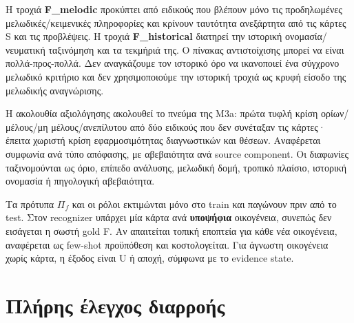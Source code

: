 \documentclass[
  10pt,
  a4paper,
]{report}
\begin{document}
Η τροχιά \textbf{F\_melodic} προκύπτει από ειδικούς που βλέπουν μόνο τις
προδηλωμένες μελωδικές/κειμενικές πληροφορίες και κρίνουν ταυτότητα
ανεξάρτητα από τις κάρτες S και τις προβλέψεις. Η τροχιά
\textbf{F\_historical} διατηρεί την ιστορική ονομασία/νευματική
ταξινόμηση και τα τεκμήριά της. Ο πίνακας αντιστοίχισης μπορεί να είναι
πολλά-προς-πολλά. Δεν αναγκάζουμε τον ιστορικό όρο να ικανοποιεί ένα
σύγχρονο μελωδικό κριτήριο και δεν χρησιμοποιούμε την ιστορική τροχιά ως
κρυφή είσοδο της μελωδικής αναγνώρισης.

Η ακολουθία αξιολόγησης ακολουθεί το πνεύμα της Μ3a: πρώτα τυφλή κρίση
ορίων/μέλους/μη μέλους/ανεπίλυτου από δύο ειδικούς που δεν συνέταξαν τις
κάρτες· έπειτα χωριστή κρίση εφαρμοσιμότητας διαγνωστικών και θέσεων.
Αναφέρεται συμφωνία ανά τύπο απόφασης, με αβεβαιότητα ανά source
component. Οι διαφωνίες ταξινομούνται ως όριο, επίπεδο ανάλυσης,
μελωδική δομή, τροπικό πλαίσιο, ιστορική ονομασία ή πηγολογική
αβεβαιότητα.

Τα πρότυπα \(\Pi_f\) και οι ρόλοι εκτιμώνται μόνο στο train και παγώνουν
πριν από το test. Στον recognizer υπάρχει μία κάρτα ανά
\textbf{υποψήφια} οικογένεια, συνεπώς δεν εισάγεται η σωστή gold F. Αν
απαιτείται τοπική εποπτεία για κάθε νέα οικογένεια, αναφέρεται ως
few-shot προϋπόθεση και κοστολογείται. Για άγνωστη οικογένεια χωρίς
κάρτα, η έξοδος είναι U ή αποχή, σύμφωνα με το evidence state.

\section{Πλήρης έλεγχος
διαρροής}\label{ux3c0ux3bbux3aeux3c1ux3b7ux3c2-ux3adux3bbux3b5ux3b3ux3c7ux3bfux3c2-ux3b4ux3b9ux3b1ux3c1ux3c1ux3bfux3aeux3c2}
\end{document}

